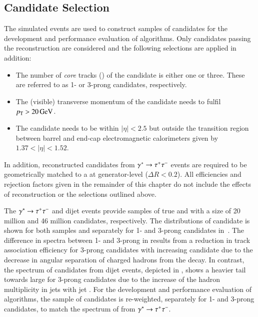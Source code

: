 \subsection{\tauhadvis Candidate Selection}
\label{sec:tauid_candidate_selection}

The simulated events are used to construct samples of \tauhadvis candidates for
the development and performance evaluation of \tauid algorithms. Only candidates
passing the \tauhadvis reconstruction are considered and the following
selections are applied in addition:
\begin{itemize}

\item The number of \emph{core} tracks (\Ntracks) of the \tauhadvis candidate is
  either one or three. These are referred to as 1- or 3-prong \tauhadvis
  candidates, respectively.

\item The (visible) transverse momentum of the candidate needs to
  fulfil $\pT > \SI{20}{\GeV}$.

\item The \tauhadvis candidate needs to be within $|\eta| < 2.5$ but
  outside the transition region between barrel and end-cap
  electromagnetic calorimeters given by $1.37 < |\eta| < 1.52$.

\end{itemize}
In addition, reconstructed \tauhadvis candidates from
$\gamma^{*} \to \tau^{+} \tau^{-}$ events are required to be geometrically
matched to a \tauhad at generator-level ($\Delta R < 0.2$).
All efficiencies and rejection factors given in the remainder of this
chapter do not include the effects of \tauhadvis reconstruction or the
selections outlined above.

The $\gamma^{*} \to \tau^{+} \tau^{-}$ and dijet events provide samples of
true and \faketauhadvis with a size of 20 million and 46 million
candidates, respectively. The distributions of \tauhadvis candidate
\pT is shown for both samples and separately for 1- and 3-prong
candidates in~. The difference in \pT
spectra between 1- and 3-prong \truetauhadvis in
 results from a reduction in
track association efficiency for 3-prong \tauhadvis candidates with
increasing candidate \pT due to the decrease in angular separation of
charged hadrons from the \tauleptonC decay. In contrast, the \pT
spectrum of \tauhadvis candidates from dijet events, depicted in
, shows a heavier tail towards
large \pT for 3-prong candidates due to the increase of the hadron
multiplicity in jets with jet \pT. For the development and performance
evaluation of \tauid algorithms, the sample of \faketauhadvis
candidates is re-weighted, separately for 1- and 3-prong candidates,
to match the \pT spectrum of \truetauhadvis from
$\gamma^{*} \to \tau^{+} \tau^{-}$.

